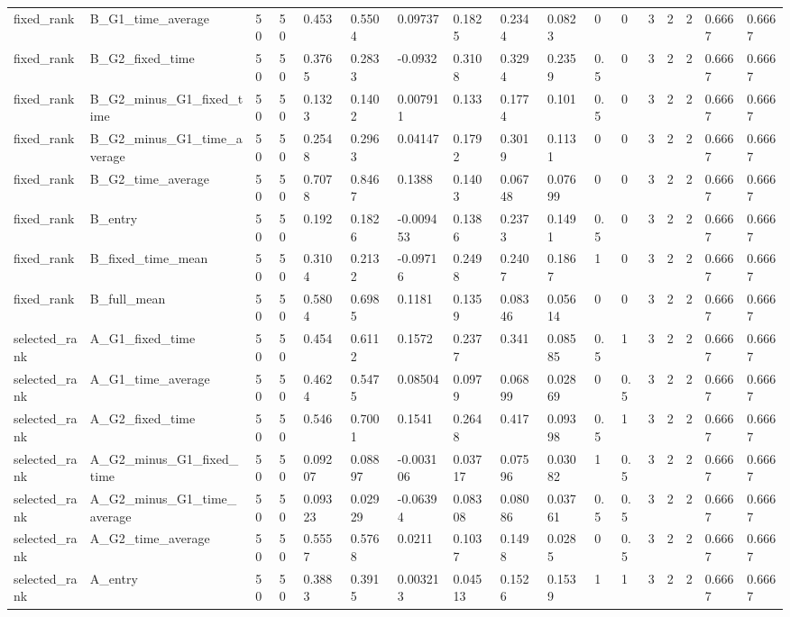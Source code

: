 \begin{longtable}{lllllllllllllllll}
fixed\_rank & B\_G1\_time\_average & 50 & 50 & 0.453 & 0.5504 & 0.09737 & 0.1825 & 0.2344 & 0.0823 & 0 & 0 & 3 & 2 & 2 & 0.6667 & 0.6667 \\
fixed\_rank & B\_G2\_fixed\_time & 50 & 50 & 0.3765 & 0.2833 & -0.0932 & 0.3108 & 0.3294 & 0.2359 & 0.5 & 0 & 3 & 2 & 2 & 0.6667 & 0.6667 \\
fixed\_rank & B\_G2\_minus\_G1\_fixed\_time & 50 & 50 & 0.1323 & 0.1402 & 0.007911 & 0.133 & 0.1774 & 0.101 & 0.5 & 0 & 3 & 2 & 2 & 0.6667 & 0.6667 \\
fixed\_rank & B\_G2\_minus\_G1\_time\_average & 50 & 50 & 0.2548 & 0.2963 & 0.04147 & 0.1792 & 0.3019 & 0.1131 & 0 & 0 & 3 & 2 & 2 & 0.6667 & 0.6667 \\
fixed\_rank & B\_G2\_time\_average & 50 & 50 & 0.7078 & 0.8467 & 0.1388 & 0.1403 & 0.06748 & 0.07699 & 0 & 0 & 3 & 2 & 2 & 0.6667 & 0.6667 \\
fixed\_rank & B\_entry & 50 & 50 & 0.192 & 0.1826 & -0.009453 & 0.1386 & 0.2373 & 0.1491 & 0.5 & 0 & 3 & 2 & 2 & 0.6667 & 0.6667 \\
fixed\_rank & B\_fixed\_time\_mean & 50 & 50 & 0.3104 & 0.2132 & -0.09716 & 0.2498 & 0.2407 & 0.1867 & 1 & 0 & 3 & 2 & 2 & 0.6667 & 0.6667 \\
fixed\_rank & B\_full\_mean & 50 & 50 & 0.5804 & 0.6985 & 0.1181 & 0.1359 & 0.08346 & 0.05614 & 0 & 0 & 3 & 2 & 2 & 0.6667 & 0.6667 \\
selected\_rank & A\_G1\_fixed\_time & 50 & 50 & 0.454 & 0.6112 & 0.1572 & 0.2377 & 0.341 & 0.08585 & 0.5 & 1 & 3 & 2 & 2 & 0.6667 & 0.6667 \\
selected\_rank & A\_G1\_time\_average & 50 & 50 & 0.4624 & 0.5475 & 0.08504 & 0.0979 & 0.06899 & 0.02869 & 0 & 0.5 & 3 & 2 & 2 & 0.6667 & 0.6667 \\
selected\_rank & A\_G2\_fixed\_time & 50 & 50 & 0.546 & 0.7001 & 0.1541 & 0.2648 & 0.417 & 0.09398 & 0.5 & 1 & 3 & 2 & 2 & 0.6667 & 0.6667 \\
selected\_rank & A\_G2\_minus\_G1\_fixed\_time & 50 & 50 & 0.09207 & 0.08897 & -0.003106 & 0.03717 & 0.07596 & 0.03082 & 1 & 0.5 & 3 & 2 & 2 & 0.6667 & 0.6667 \\
selected\_rank & A\_G2\_minus\_G1\_time\_average & 50 & 50 & 0.09323 & 0.02929 & -0.06394 & 0.08308 & 0.08086 & 0.03761 & 0.5 & 0.5 & 3 & 2 & 2 & 0.6667 & 0.6667 \\
selected\_rank & A\_G2\_time\_average & 50 & 50 & 0.5557 & 0.5768 & 0.0211 & 0.1037 & 0.1498 & 0.0285 & 0 & 0.5 & 3 & 2 & 2 & 0.6667 & 0.6667 \\
selected\_rank & A\_entry & 50 & 50 & 0.3883 & 0.3915 & 0.003213 & 0.04513 & 0.1526 & 0.1539 & 1 & 1 & 3 & 2 & 2 & 0.6667 & 0.6667 \\

\end{longtable}
